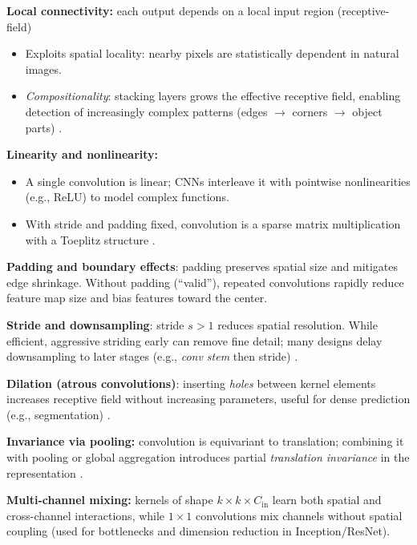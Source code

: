 \textbf{Local connectivity:} each output depends on a local input region (\gls{receptive-field})
\begin{itemize}
    \item Exploits spatial locality: nearby pixels are statistically dependent in natural images.
    \item \emph{Compositionality}: stacking layers grows the effective receptive field, enabling detection of increasingly complex patterns (edges \(\to\) corners \(\to\) object parts) \cite{GoodfellowEtAl2016}.
\end{itemize}

\textbf{Linearity and nonlinearity:}
\begin{itemize}
    \item A single convolution is linear; CNNs interleave it with pointwise nonlinearities (e.g., ReLU) to model complex functions.
    \item With stride and padding fixed, convolution is a sparse matrix multiplication with a Toeplitz structure \cite{GoodfellowEtAl2016}.
\end{itemize}

\textbf{Padding and boundary effects}: padding preserves spatial size and mitigates edge shrinkage. Without padding (``valid''), repeated convolutions rapidly reduce feature map size and bias features toward the center.

\textbf{Stride and downsampling}: stride \(s>1\) reduces spatial resolution. While efficient, aggressive striding early can remove fine detail; many designs delay downsampling to later stages (e.g., \textit{conv stem} then stride) \cite{Krizhevsky2012,He2016}.

\textbf{Dilation (atrous convolutions)}: inserting \emph{holes} between kernel elements increases receptive field without increasing parameters, useful for dense prediction (e.g., segmentation) \cite{GoodfellowEtAl2016}.

\textbf{Invariance via pooling:} convolution is equivariant to translation; combining it with pooling or global aggregation introduces partial \emph{translation invariance} in the representation \cite{GoodfellowEtAl2016}.

\textbf{Multi-channel mixing:} kernels of shape \(k\times k\times C_{\text{in}}\) learn both spatial and cross-channel interactions, while $1\times1$ convolutions mix channels without spatial coupling (used for bottlenecks and dimension reduction in Inception/ResNet).

